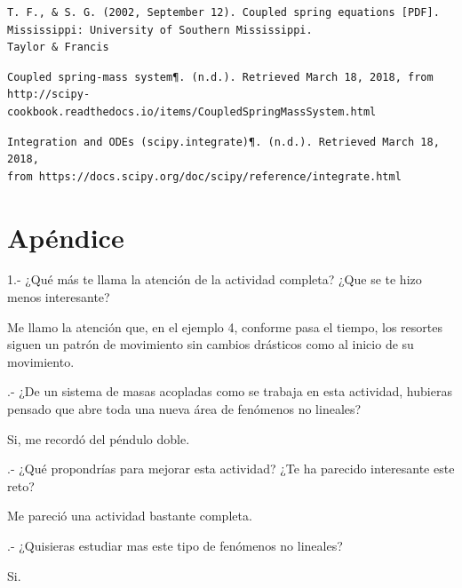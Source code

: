 \documentclass{article}
\begin{document}
\begin{verbatim}
T. F., & S. G. (2002, September 12). Coupled spring equations [PDF]. 
Mississippi: University of Southern Mississippi.
Taylor & Francis
\end{verbatim}

\begin{verbatim}
Coupled spring-mass system¶. (n.d.). Retrieved March 18, 2018, from
http://scipy-cookbook.readthedocs.io/items/CoupledSpringMassSystem.html 
\end{verbatim}

\begin{verbatim}
Integration and ODEs (scipy.integrate)¶. (n.d.). Retrieved March 18, 2018,
from https://docs.scipy.org/doc/scipy/reference/integrate.html 
\end{verbatim}

\section{Apéndice}


    1.- ¿Qué más te llama la atención de la actividad completa? ¿Que se te hizo menos interesante?
    
    \vspace{0.3cm}
		Me llamo la atención que, en el ejemplo 4, conforme pasa el tiempo, los resortes siguen un patrón de movimiento sin cambios drásticos como al inicio de su movimiento.
    \vspace{0.3cm}
    
.- ¿De un sistema de masas acopladas como se trabaja en esta actividad, hubieras pensado que abre toda una nueva área de fenómenos no lineales? 
    
    \vspace{0.3cm}
	Si, me recordó del péndulo doble.
    \vspace{0.3cm}
    
.- ¿Qué propondrías para mejorar esta actividad? ¿Te ha parecido interesante este reto?

	\vspace{0.3cm}
	Me pareció una actividad bastante completa.
    \vspace{0.3cm}

.- ¿Quisieras estudiar mas este tipo de fenómenos no lineales?

	\vspace{0.3cm}
	Si.
    \vspace{0.3cm}
\end{document}
